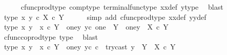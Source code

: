\begin{isabellebody}
\ \ \ \ \isamarkupfalse%
\ cfunc{\isacharunderscore}{\kern0pt}prod{\isacharunderscore}{\kern0pt}type\ comp{\isacharunderscore}{\kern0pt}type\ terminal{\isacharunderscore}{\kern0pt}func{\isacharunderscore}{\kern0pt}type\ x{}x{}{\isacharunderscore}{\kern0pt}def\ y{}{\isacharprime}{\kern0pt}{\isacharunderscore}{\kern0pt}type\ \isamarkupfalse%
\ blast\isanewline
\ \ \isamarkupfalse%
\ type{}{\isacharcolon}{\kern0pt}\ {\isachardoublequoteopen}{\isasymlangle}x{}{\isacharcomma}{\kern0pt}\ y{}{\isasymrangle}\ {\isasymin}\isactrlsub c\ {\isacharparenleft}{\kern0pt}X\ {\isasymtimes}\isactrlsub c\ Y{\isacharparenright}{\kern0pt}{\isachardoublequoteclose}\isanewline
\ \ \ \ \isamarkupfalse%
\ {\isacharparenleft}{\kern0pt}simp\ add{\isacharcolon}{\kern0pt}\ cfunc{\isacharunderscore}{\kern0pt}prod{\isacharunderscore}{\kern0pt}type\ x{}x{}{\isacharunderscore}{\kern0pt}def\ y{}y{}{\isacharunderscore}{\kern0pt}def{\isacharparenright}{\kern0pt}\isanewline
\ \ \isamarkupfalse%
\ \isamarkupfalse%
\ type{}{\isacharcolon}{\kern0pt}\ {\isachardoublequoteopen}{\isasymlangle}x{}{\isacharcomma}{\kern0pt}\ y{}{\isasymrangle}\ {\isasymamalg}\ {\isasymlangle}x{}\ {\isasymcirc}\isactrlsub c\ {\isasymbeta}\isactrlbsub Y\ {\isasymsetminus}\ {\isacharparenleft}{\kern0pt}one{\isacharcomma}{\kern0pt}y{}{\isacharparenright}{\kern0pt}\isactrlesub {\isacharcomma}{\kern0pt}\ y{}\isactrlsup c{\isasymrangle}\ {\isacharcolon}{\kern0pt}{\isacharparenleft}{\kern0pt}one\ {\isasymCoprod}\ {\isacharparenleft}{\kern0pt}Y\ {\isasymsetminus}\ {\isacharparenleft}{\kern0pt}one{\isacharcomma}{\kern0pt}y{}{\isacharparenright}{\kern0pt}{\isacharparenright}{\kern0pt}{\isacharparenright}{\kern0pt}\ {\isasymrightarrow}\ {\isacharparenleft}{\kern0pt}X\ {\isasymtimes}\isactrlsub c\ Y{\isacharparenright}{\kern0pt}{\isachardoublequoteclose}\isanewline
\ \ \ \ \isamarkupfalse%
\ cfunc{\isacharunderscore}{\kern0pt}coprod{\isacharunderscore}{\kern0pt}type\ type{}\ \isamarkupfalse%
\ blast\isanewline
\ \ \isamarkupfalse%
\ \isamarkupfalse%
\ type{}{\isacharcolon}{\kern0pt}\ {\isachardoublequoteopen}{\isacharparenleft}{\kern0pt}{\isacharparenleft}{\kern0pt}{\isasymlangle}x{}{\isacharcomma}{\kern0pt}\ y{}{\isasymrangle}\ {\isasymamalg}\ {\isasymlangle}x{}\ {\isasymcirc}\isactrlsub c\ {\isasymbeta}\isactrlbsub Y\ {\isasymsetminus}\ {\isacharparenleft}{\kern0pt}one{\isacharcomma}{\kern0pt}y{}{\isacharparenright}{\kern0pt}\isactrlesub {\isacharcomma}{\kern0pt}\ y{}\isactrlsup c{\isasymrangle}{\isacharparenright}{\kern0pt}\ {\isasymcirc}\isactrlsub c\ \ try{\isacharunderscore}{\kern0pt}cast\ y{}{\isacharparenright}{\kern0pt}\ {\isacharcolon}{\kern0pt}\ Y\ {\isasymrightarrow}\ {\isacharparenleft}{\kern0pt}X\ {\isasymtimes}\isactrlsub c\ Y{\isacharparenright}{\kern0pt}{\isachardoublequoteclose}\isanewline

\end{isabellebody}
